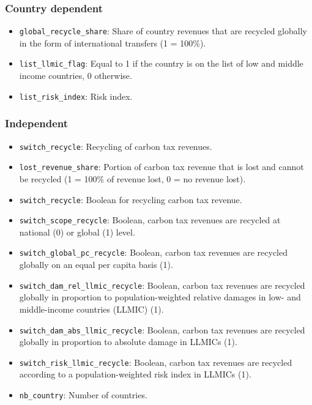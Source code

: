 \documentclass[
]{article}
\providecommand{\tightlist}{%
  \setlength{\itemsep}{0pt}\setlength{\parskip}{0pt}}
\begin{document}
\subsubsection{Country dependent}\label{country-dependent-3}

\begin{itemize}
\tightlist
\item
  \texttt{global\_recycle\_share}: Share of country revenues that are
  recycled globally in the form of international transfers (1 = 100\%).
\item
  \texttt{list\_llmic\_flag}: Equal to 1 if the country is on the list
  of low and middle income countries, 0 otherwise.
\item
  \texttt{list\_risk\_index}: Risk index.
\end{itemize}

\subsubsection{Independent}\label{Independent-20}

\begin{itemize}
\tightlist
\item
  \texttt{switch\_recycle}: Recycling of carbon tax revenues.
\item
  \texttt{lost\_revenue\_share}: Portion of carbon tax revenue that is
  lost and cannot be recycled (1 = 100\% of revenue lost, 0 = no revenue
  lost).
\item
  \texttt{switch\_recycle}: Boolean for recycling carbon tax revenue.
\item
  \texttt{switch\_scope\_recycle}: Boolean, carbon tax revenues are
  recycled at national (0) or global (1) level.
\item
  \texttt{switch\_global\_pc\_recycle}: Boolean, carbon tax revenues are
  recycled globally on an equal per capita basis (1).
\item
  \texttt{switch\_dam\_rel\_llmic\_recycle}: Boolean, carbon tax
  revenues are recycled globally in proportion to population-weighted
  relative damages in low- and middle-income countries (LLMIC) (1).
\item
  \texttt{switch\_dam\_abs\_llmic\_recycle}: Boolean, carbon tax
  revenues are recycled globally in proportion to absolute damage in
  LLMICs (1).
\item
  \texttt{switch\_risk\_llmic\_recycle}: Boolean, carbon tax revenues
  are recycled according to a population-weighted risk index in LLMICs
  (1).
\item
  \texttt{nb\_country}: Number of countries.
\end{itemize}
\end{document}
